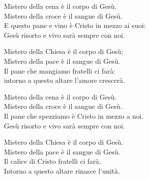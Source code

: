 
\strofa Mistero della cena è il corpo di Gesù.\\
Mistero della croce è il sangue di Gesù.\\
E questo pane e vino è Cristo in mezzo ai suoi:\\
Gesù risorto e vivo sarà sempre con noi.

\spazio

\strofa Mistero della Chiesa è il corpo di Gesù;\\
Mistero della pace è il sangue di Gesù.\\
Il pane che mangiamo fratelli ci farà:\\
intorno a questo altare l'amore crescerà.

\spazio

\strofa Mistero della cena è il corpo di Gesù.\\
Mistero della croce è il sangue di Gesù.\\
Il pane che spezziamo è Cristo in mezzo a noi.\\
Gesù risorto e vivo sarà sempre con noi.

\spazio

\strofa Mistero della Chiesa è il corpo di Gesù.\\
Mistero della pace è il sangue di Gesù.\\
Il calice di Cristo fratelli ci farà.\\
Intorno a questo altare rinasce l'unità. 